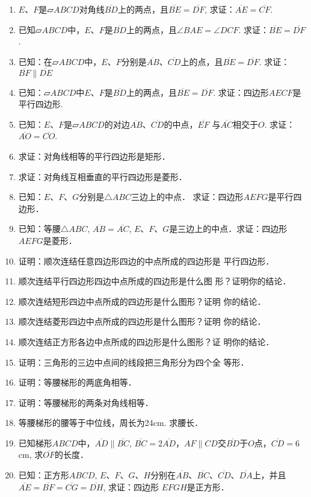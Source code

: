 \begin{ex}
\begin{enumerate}
    \item $E$、$F$是$\parallelogram ABCD$对角线$\overline{BD}$上的两点，且$\overline{BE}=\overline{DF}$,  求证：$\overline{AE}=\overline{CF}$.
    \item 已知$\parallelogram ABCD$中，$E$、$F$是$\overline{BD}$上的两点，且$\angle BAE=\angle DCF$.  求证：$\overline{BE}=\overline{DF}$.
\item 已知：在$\parallelogram ABCD$中，$E$、$F$分别是$\overline{AB}$、$\overline{CD}$上的点，且$\overline{BE}=\overline{DF}$. 求证：$\overline{BF}\parallel\overline{DE}$

\item 已知：$\parallelogram ABCD$中$E$、$F$是$\overline{BD}$上的两点，且$\overline{BE}=\overline{DF}$. 求证：四边形$AECF$是平行四边形.
\item 已知：$E$、$F$是$\parallelogram ABCD$的对边$\overline{AB}$、$\overline{CD}$的中点，$\overline{EF}$
与$\overline{AC}$相交于$O$. 求证：$\overline{AO}=\overline{CO}$.
\item 求证：对角线相等的平行四边形是矩形．
\item 求证：对角线互相垂直的平行四边形是菱形．
\item 已知：$E$、$F$、$G$分别是$\triangle ABC$三边上的中点．
求证：四边形$AEFG$是平行四边形．
\item 已知：等腰$\triangle ABC$, $\overline{AB}=\overline{AC}$, $E$、$F$、$G$是三边上的中点．求证：四边形$AEFG$是菱形．
    
\item 证明：顺次连结任意四边形四边的中点所成的四边形是
平行四边形．
\item 顺次连结平行四边形四边中点所成的四边形是什么图
形？证明你的结论．
\item 顺次连结短形四边中点所成的四边形是什么图形？证明
你的结论．
\item 顺次连结菱形四边中点所成的四边形是什么图形？证明
你的结论．
\item 顺次连结正方形各边中点所成的四边形是什么图形？证
明你的结论．
\item 证明：三角形的三边中点间的线段把三角形分为四个全
等形．
\item 证明：等腰梯形的两底角相等．
\item 证明：等腰梯形的两条对角线相等．
\item 等腰梯形的腰等于中位线，周长为24cm. 求腰长．
\item 已知梯形$ABCD$中，$\overline{AD}\parallel \overline{BC}$, $\overline{BC}=2\overline{AD}$，$AF\parallel CD$交$\overline{BD}$于$O$点，$\overline{CD}=6$cm, 求$\overline{OF}$的长度．

\item 已知：正方形$ABCD$, $E$、$F$、$G$、$H$分别在$\overline{AB}$、$\overline{BC}$、$\overline{CD}$、$\overline{DA}$上，并且$\overline{AE}=\overline{BF}=\overline{CG}=\overline{DH}$, 求证：四边形
$EFGH$是正方形．
\end{enumerate}
\end{ex}



